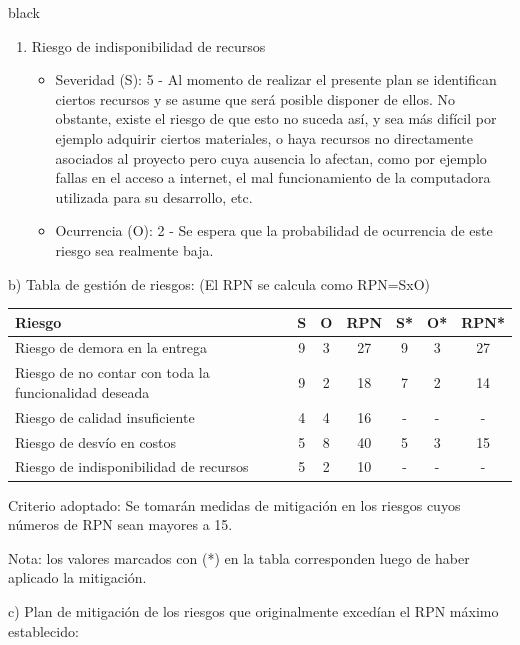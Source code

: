 \documentclass[
11pt, %
codirector, %
]{charter}
\begin{document}
\begin{consigna}{black}
\begin{enumerate}
\item Riesgo de indisponibilidad de recursos
\begin{itemize}
	\item Severidad (S): 5 - Al momento de realizar el presente plan se identifican ciertos recursos y se asume que será posible disponer de ellos. No obstante, existe el riesgo de que esto no suceda así, y sea más difícil por ejemplo adquirir ciertos materiales, o haya recursos no directamente asociados al proyecto pero cuya ausencia lo afectan, como por ejemplo fallas en el acceso a internet, el mal funcionamiento de la computadora utilizada para su desarrollo, etc.
	\item Ocurrencia (O): 2 - Se espera que la probabilidad de ocurrencia de este riesgo sea realmente baja.
\end{itemize}

\end{enumerate}

b) Tabla de gestión de riesgos:      (El RPN se calcula como RPN=SxO)

\begin{table}[htpb]
\centering
\begin{tabularx}{\linewidth}{@{}|X|c|c|c|c|c|c|@{}}
\hline
\rowcolor[HTML]{C0C0C0}
Riesgo 													& S & O & RPN & S* & O* & RPN* \\ \hline
Riesgo de demora en la entrega							& 9 & 3 & 27 &  9  &  3  & 27    \\ \hline
Riesgo de no contar con toda la funcionalidad deseada	& 9 & 2 & 18  & 7  & 2 &  14    \\ \hline
Riesgo de calidad insuficiente							& 4 & 4 & 16 &  - &  - &   -  \\ \hline
Riesgo de desvío en costos								& 5 & 8 & 40 & 5  & 3  &  15   \\ \hline
Riesgo de indisponibilidad de recursos					& 5 & 2 & 10 & -  & -  &   -   \\ \hline
\end{tabularx}%
\end{table}

Criterio adoptado:
Se tomarán medidas de mitigación en los riesgos cuyos números de RPN sean mayores a 15.

Nota: los valores marcados con (*) en la tabla corresponden luego de haber aplicado la mitigación.

c) Plan de mitigación de los riesgos que originalmente excedían el RPN máximo establecido:
\begin{enumerate}



\end{enumerate}
\end{consigna}
\end{document}
